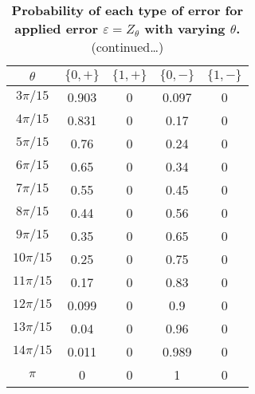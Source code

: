 \documentclass[superscriptaddress,twocolumn,showpacs,prb]{revtex4-1}
\begin{document}
\begin{table}[h!]
\begin{center}
 \begin{tabular}{c c c c c} 
 \hline
 \hline
 $\theta$ & $\{0 , +\}$ & $\{1 , +\}$&$\{0 , -\}$&$\{1 , -\}$ \\ [0.5ex] 
 \hline
 \hline
 $3\pi/15$ &0.903 &0 &0.097&0   \\ 
 \hline
 $4\pi/15$ &0.831 &0&0.17&0  \\
 \hline
 $5\pi/15$ & 0.76&0&0.24&0\\
 \hline
 $6\pi/15$ & 0.65&0&0.34&0   \\  
\hline
 $7\pi/15$ & 0.55&0&0.45&0   \\ 
 \hline
 $8\pi/15$ & 0.44&0&0.56&0 \\
 \hline
  $9\pi/15$&0.35&0&0.65&0\\
  \hline
  $10\pi/15$&0.25&0&0.75&0\\
  \hline
  $11\pi/15$&0.17&0&0.83&0\\
  \hline
  $12\pi/15$&0.099&0&0.9&0\\
  \hline
  $13\pi/15$&0.04&0&0.96&0\\
  \hline
$14\pi/15$&0.011&0&0.989&0\\
  \hline
  $\pi$&0&0&1&0\\[1ex]
  \hline
 \hline
\end{tabular}
\caption{\textbf{Probability of each type of error for applied error $\varepsilon=Z_{\theta}$ with varying $\theta$.} (continued\dots)}
\label{qed_table7}
\end{center}
\end{table}
\end{document}
